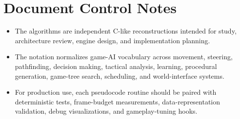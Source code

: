\documentclass[10pt,letterpaper]{article}
\begin{document}
\section*{Document Control Notes}
{}
\begin{itemize}
\item The algorithms are independent C-like reconstructions intended for study, architecture review, engine design, and implementation planning.
\item The notation normalizes game-AI vocabulary across movement, steering, pathfinding, decision making, tactical analysis, learning, procedural generation, game-tree search, scheduling, and world-interface systems.
\item For production use, each pseudocode routine should be paired with deterministic tests, frame-budget measurements, data-representation validation, debug visualizations, and gameplay-tuning hooks.
\end{itemize}
\end{document}
